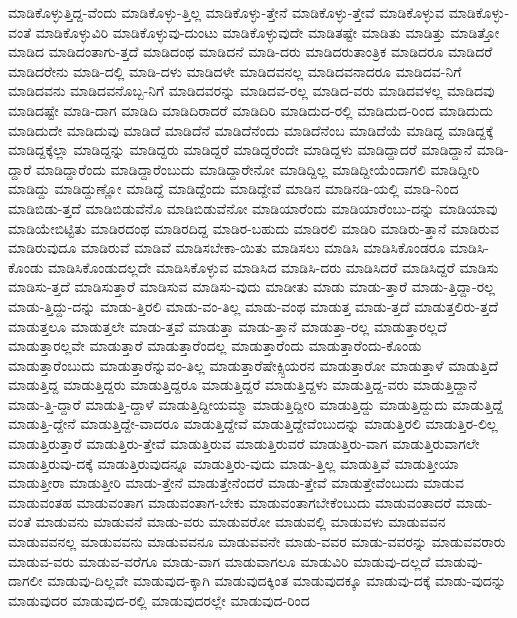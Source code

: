 {ಮಾಡಿಕೊಳ್ಳುತ್ತಿದ್ದ-ವೆಂದು
ಮಾಡಿಕೊಳ್ಳು-ತ್ತಿಲ್ಲ
ಮಾಡಿಕೊಳ್ಳು-ತ್ತೇನೆ
ಮಾಡಿಕೊಳ್ಳು-ತ್ತೇವೆ
ಮಾಡಿಕೊಳ್ಳುವ
ಮಾಡಿಕೊಳ್ಳು-ವಂತೆ
ಮಾಡಿಕೊಳ್ಳುವಿರಿ
ಮಾಡಿಕೊಳ್ಳುವು-ದುಂಟು
ಮಾಡಿಕೊಳ್ಳುವುದೇ
ಮಾಡಿತಷ್ಟೇ
ಮಾಡಿತು
ಮಾಡಿತ್ತು
ಮಾಡಿತ್ತೋ
ಮಾಡಿದ
ಮಾಡಿದಂತಾಗು-ತ್ತದೆ
ಮಾಡಿದಂಥ
ಮಾಡಿದನೆ
ಮಾಡಿ-ದರು
ಮಾಡಿದರುತಾಂತ್ರಿಕ
ಮಾಡಿದರೂ
ಮಾಡಿದರೆ
ಮಾಡಿದರೇನು
ಮಾಡಿ-ದಲ್ಲಿ
ಮಾಡಿ-ದಳು
ಮಾಡಿದಳೇ
ಮಾಡಿದವನಲ್ಲ
ಮಾಡಿದವನಾದರೂ
ಮಾಡಿದವ-ನಿಗೆ
ಮಾಡಿದವನು
ಮಾಡಿದವನೊಬ್ಬ-ನಿಗೆ
ಮಾಡಿದವರನ್ನು
ಮಾಡಿದವ-ರಲ್ಲ
ಮಾಡಿದ-ವರು
ಮಾಡಿದವಳಲ್ಲ
ಮಾಡಿದವು
ಮಾಡಿದಷ್ಟೇ
ಮಾಡಿ-ದಾಗ
ಮಾಡಿದಿ
ಮಾಡಿದಿರಾದರೆ
ಮಾಡಿದಿರಿ
ಮಾಡಿದುದ-ರಲ್ಲಿ
ಮಾಡಿದುದ-ರಿಂದ
ಮಾಡಿದುದು
ಮಾಡಿದುದೇ
ಮಾಡಿದುವು
ಮಾಡಿದೆ
ಮಾಡಿದೆನೆ
ಮಾಡಿದೆನೆಂದು
ಮಾಡಿದೆನೆಂಬ
ಮಾಡಿದೆಯೆ
ಮಾಡಿದ್ದ
ಮಾಡಿದ್ದಕ್ಕೆ
ಮಾಡಿದ್ದಕ್ಕೆಲ್ಲಾ
ಮಾಡಿದ್ದನ್ನು
ಮಾಡಿದ್ದರು
ಮಾಡಿದ್ದರೆ
ಮಾಡಿದ್ದರೆಂದೇ
ಮಾಡಿದ್ದಳು
ಮಾಡಿದ್ದಾದರೆ
ಮಾಡಿದ್ದಾನೆ
ಮಾಡಿ-ದ್ದಾರೆ
ಮಾಡಿದ್ದಾರೆಂದು
ಮಾಡಿದ್ದಾರೆಂಬುದು
ಮಾಡಿದ್ದಾರೇನೋ
ಮಾಡಿದ್ದಿಲ್ಲ
ಮಾಡಿದ್ದೀಯೆಂದಾಗಲಿ
ಮಾಡಿದ್ದೀರಿ
ಮಾಡಿದ್ದು
ಮಾಡಿದ್ದುಣ್ಣೋ
ಮಾಡಿದ್ದೆ
ಮಾಡಿದ್ದೆಂದು
ಮಾಡಿದ್ದೇವೆ
ಮಾಡಿನ
ಮಾಡಿನಡಿ-ಯಲ್ಲಿ
ಮಾಡಿ-ನಿಂದ
ಮಾಡಿಬಿಡು-ತ್ತದೆ
ಮಾಡಿಬಿಡುವೆನೊ
ಮಾಡಿಬಿಡುವೆನೋ
ಮಾಡಿಯಾರೆಂದು
ಮಾಡಿಯಾರೆಂಬು-ದನ್ನು
ಮಾಡಿಯಾವು
ಮಾಡಿಯೇಬಿಟ್ಟಿತು
ಮಾಡಿರದಂಥ
ಮಾಡಿರದಿದ್ದ
ಮಾಡಿರ-ಬಹುದು
ಮಾಡಿರಲಿ
ಮಾಡಿರಿ
ಮಾಡಿರು-ತ್ತಾನೆ
ಮಾಡಿರುವ
ಮಾಡಿರುವುದೂ
ಮಾಡಿರುವೆ
ಮಾಡಿವೆ
ಮಾಡಿಸಬೇಕಾ-ಯಿತು
ಮಾಡಿಸಲು
ಮಾಡಿಸಿ
ಮಾಡಿಸಿಕೊಂಡರೂ
ಮಾಡಿಸಿ-ಕೊಂಡು
ಮಾಡಿಸಿಕೊಂಡುದಲ್ಲದೇ
ಮಾಡಿಸಿಕೊಳ್ಳುವ
ಮಾಡಿಸಿದ
ಮಾಡಿಸಿ-ದರು
ಮಾಡಿಸಿದರೆ
ಮಾಡಿಸಿದ್ದರೆ
ಮಾಡಿಸು
ಮಾಡಿಸು-ತ್ತದೆ
ಮಾಡಿಸುತ್ತಾರೆ
ಮಾಡಿಸುವ
ಮಾಡಿಸು-ವುದು
ಮಾಡೀತು
ಮಾಡು
ಮಾಡು-ತ್ತಾರೆ
ಮಾಡು-ತ್ತಿದ್ದಾ-ರಲ್ಲ
ಮಾಡು-ತ್ತಿದ್ದು-ದನ್ನು
ಮಾಡು-ತ್ತಿರಲಿ
ಮಾಡು-ವಂ-ತಿಲ್ಲ
ಮಾಡು-ವಂಥ
ಮಾಡುತ್ತ
ಮಾಡು-ತ್ತದೆ
ಮಾಡುತ್ತಲಿರು-ತ್ತದೆ
ಮಾಡುತ್ತಲೂ
ಮಾಡುತ್ತಲೇ
ಮಾಡು-ತ್ತವೆ
ಮಾಡುತ್ತಾ
ಮಾಡು-ತ್ತಾನೆ
ಮಾಡುತ್ತಾ-ರಲ್ಲ
ಮಾಡುತ್ತಾರಲ್ಲದೆ
ಮಾಡುತ್ತಾರಲ್ಲವೇ
ಮಾಡುತ್ತಾರೆ
ಮಾಡುತ್ತಾರೆಂದಲ್ಲ
ಮಾಡುತ್ತಾರೆಂದು
ಮಾಡುತ್ತಾರೆಂದು-ಕೊಂಡು
ಮಾಡುತ್ತಾರೆಂಬುದು
ಮಾಡುತ್ತಾರೆನ್ನುವಂ-ತಿಲ್ಲ
ಮಾಡುತ್ತಾರೆಷೇಕ್ಸ್ಪಿಯರನ
ಮಾಡುತ್ತಾರೋ
ಮಾಡುತ್ತಾಳೆ
ಮಾಡುತ್ತಿದೆ
ಮಾಡುತ್ತಿದ್ದ
ಮಾಡುತ್ತಿದ್ದರು
ಮಾಡುತ್ತಿದ್ದರೂ
ಮಾಡುತ್ತಿದ್ದರೆ
ಮಾಡುತ್ತಿದ್ದಳು
ಮಾಡುತ್ತಿದ್ದ-ವರು
ಮಾಡುತ್ತಿದ್ದಾನೆ
ಮಾಡು-ತ್ತಿ-ದ್ದಾರೆ
ಮಾಡುತ್ತಿ-ದ್ದಾಳೆ
ಮಾಡುತ್ತಿದ್ದೀಯಮ್ಮಾ
ಮಾಡುತ್ತಿದ್ದೀರಿ
ಮಾಡುತ್ತಿದ್ದು
ಮಾಡುತ್ತಿದ್ದುದು
ಮಾಡುತ್ತಿದ್ದೆ
ಮಾಡುತ್ತಿ-ದ್ದೇನೆ
ಮಾಡುತ್ತಿದ್ದೇ-ವಾದರೂ
ಮಾಡುತ್ತಿದ್ದೇವೆ
ಮಾಡುತ್ತಿದ್ದೇವೆಂಬುದನ್ನು
ಮಾಡುತ್ತಿರಲಿ
ಮಾಡುತ್ತಿರ-ಲಿಲ್ಲ
ಮಾಡುತ್ತಿರುತ್ತಾರೆ
ಮಾಡುತ್ತಿರು-ತ್ತೇವೆ
ಮಾಡುತ್ತಿರುವ
ಮಾಡುತ್ತಿರುವರೆ
ಮಾಡುತ್ತಿರು-ವಾಗ
ಮಾಡುತ್ತಿರುವಾಗಲೇ
ಮಾಡುತ್ತಿರುವು-ದಕ್ಕೆ
ಮಾಡುತ್ತಿರುವುದನ್ನೂ
ಮಾಡುತ್ತಿರು-ವುದು
ಮಾಡು-ತ್ತಿಲ್ಲ
ಮಾಡುತ್ತಿವೆ
ಮಾಡುತ್ತೀಯಾ
ಮಾಡುತ್ತೀರಾ
ಮಾಡುತ್ತೀರಿ
ಮಾಡು-ತ್ತೇನೆ
ಮಾಡುತ್ತೇನೆಂದರೆ
ಮಾಡು-ತ್ತೇವೆ
ಮಾಡುತ್ತೇವೆಂಬುದು
ಮಾಡುವ
ಮಾಡುವಂತಹ
ಮಾಡುವಂತಾಗ
ಮಾಡುವಂತಾಗ-ಬೇಕು
ಮಾಡುವಂತಾಗಬೇಕೆಂಬುದು
ಮಾಡುವಂತಾದರೆ
ಮಾಡು-ವಂತೆ
ಮಾಡುವನು
ಮಾಡುವನೆ
ಮಾಡು-ವರು
ಮಾಡುವರೋ
ಮಾಡುವಲ್ಲಿ
ಮಾಡುವಳು
ಮಾಡುವವನ
ಮಾಡುವವನಲ್ಲ
ಮಾಡುವವನು
ಮಾಡುವವನೂ
ಮಾಡುವವನೇ
ಮಾಡು-ವವರ
ಮಾಡು-ವವರನ್ನು
ಮಾಡುವವರಾರು
ಮಾಡುವ-ವರು
ಮಾಡುವ-ವರೆಗೂ
ಮಾಡು-ವಾಗ
ಮಾಡುವಾಗಲೂ
ಮಾಡುವಿರಿ
ಮಾಡುವು-ದಲ್ಲದೆ
ಮಾಡುವು-ದಾಗಲೀ
ಮಾಡುವು-ದಿಲ್ಲವೇ
ಮಾಡುವುದ-ಕ್ಕಾಗಿ
ಮಾಡುವುದಕ್ಕಿಂತ
ಮಾಡುವುದಕ್ಕೂ
ಮಾಡುವು-ದಕ್ಕೆ
ಮಾಡು-ವುದನ್ನು
ಮಾಡುವುದರ
ಮಾಡುವುದ-ರಲ್ಲಿ
ಮಾಡುವುದರಲ್ಲೇ
ಮಾಡುವುದ-ರಿಂದ
}
